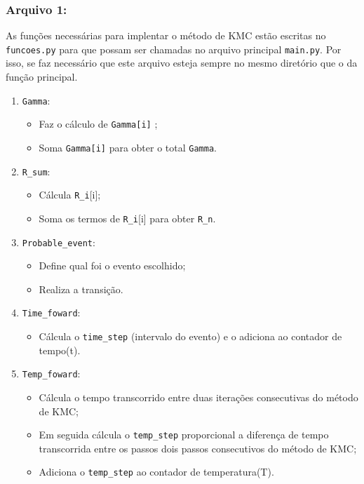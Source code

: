 \documentclass[11pt]{article}
\begin{document}
\subsubsection{Arquivo 1:}
\label{sec:orgd035455}
As funções necessárias para implentar o método de KMC estão escritas no \texttt{funcoes.py} para que possam ser chamadas no arquivo principal \texttt{main.py}. Por isso, se faz necessário que este arquivo esteja sempre no mesmo diretório que o da função principal.
\begin{enumerate}
\item \texttt{Gamma}:
\label{sec:orgecd5235}
\begin{itemize}
\item Faz o cálculo de \texttt{Gamma[i]} ;
\item Soma \texttt{Gamma[i]} para obter o total \texttt{Gamma}.
\end{itemize}
\item \texttt{R\_sum}:
\label{sec:org3fc373b}
\begin{itemize}
\item Cálcula \texttt{R\_i}[i];
\item Soma os termos de \texttt{R\_i}[i] para obter \texttt{R\_n}.
\end{itemize}
\item \texttt{Probable\_event}:
\label{sec:orgc379912}
\begin{itemize}
\item Define qual foi o evento escolhido;
\item Realiza a transição.
\end{itemize}
\item \texttt{Time\_foward}:
\label{sec:orga695e11}
\begin{itemize}
\item Cálcula o \texttt{time\_step} (intervalo do evento) e o adiciona ao contador de tempo(t).
\end{itemize}
\item \texttt{Temp\_foward}:
\label{sec:org8842058}
\begin{itemize}
\item Cálcula o tempo transcorrido entre duas iterações consecutivas do método de KMC;
\item Em seguida cálcula o \texttt{temp\_step} proporcional a diferença de tempo transcorrida entre os passos dois passos consecutivos do método de KMC;
\item Adiciona o \texttt{temp\_step} ao contador de temperatura(T).
\end{itemize}
\end{enumerate}
\end{document}
